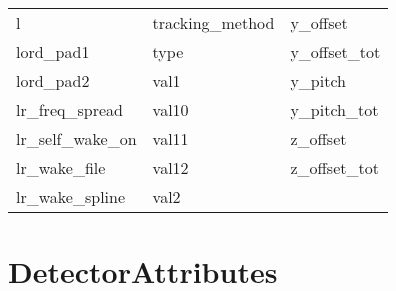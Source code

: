 \begin{tabular}{lll}
l                           & tracking_method             & y_offset                    \\
lord_pad1                   & type                        & y_offset_tot                \\
lord_pad2                   & val1                        & y_pitch                     \\
lr_freq_spread              & val10                       & y_pitch_tot                 \\
lr_self_wake_on             & val11                       & z_offset                    \\
lr_wake_file                & val12                       & z_offset_tot                \\
lr_wake_spline              & val2                        &                             \\
 \bottomrule
 \end{tabular}
 \vfill
 
 \section{DetectorAttributes}
 \label{s:list.detector}
 

